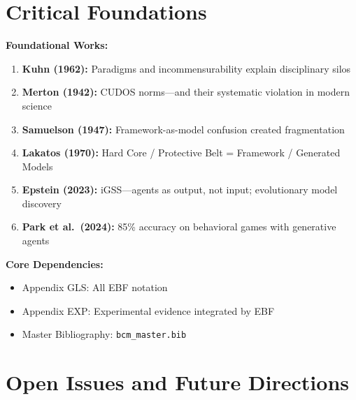 \section{Critical Foundations}
\label{sec:meta-foundations}

\begin{tcolorbox}[colback=yellow!5!white, colframe=yellow!75!black,
    title=\textbf{Critical Foundations for LIT-META}]

\textbf{Foundational Works:}
\begin{enumerate}[nosep]
    \item \textbf{Kuhn (1962):} Paradigms and incommensurability explain disciplinary silos
    \item \textbf{Merton (1942):} CUDOS norms—and their systematic violation in modern science
    \item \textbf{Samuelson (1947):} Framework-as-model confusion created fragmentation
    \item \textbf{Lakatos (1970):} Hard Core / Protective Belt = Framework / Generated Models
    \item \textbf{Epstein (2023):} iGSS---agents as output, not input; evolutionary model discovery
    \item \textbf{Park et al.\ (2024):} 85\% accuracy on behavioral games with generative agents
\end{enumerate}

\textbf{Core Dependencies:}
\begin{itemize}[nosep]
    \item Appendix GLS: All EBF notation
    \item Appendix EXP: Experimental evidence integrated by EBF
    \item Master Bibliography: \texttt{bcm\_master.bib}
\end{itemize}

\end{tcolorbox}


\section{Open Issues and Future Directions}
\label{sec:meta-open-issues}

